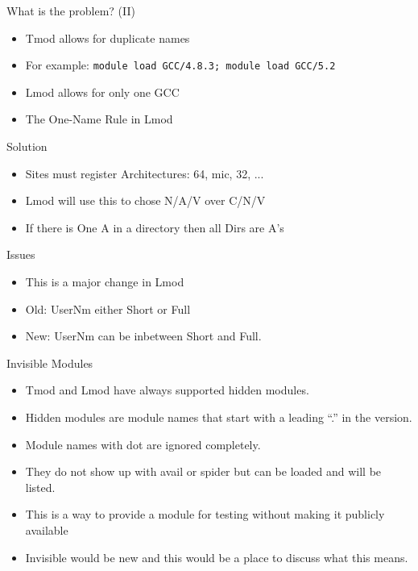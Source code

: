 \documentclass{beamer}
\begin{document}
\begin{frame}{What is the problem? (II)}
  \begin{itemize}
    \item Tmod allows for duplicate names
    \item For example: \texttt{module load GCC/4.8.3; module load GCC/5.2 }
    \item Lmod allows for only one GCC
    \item The One-Name Rule in Lmod
  \end{itemize}
\end{frame}

\begin{frame}{Solution}
  \begin{itemize}
    \item Sites must register Architectures:  64, mic, 32, ...
    \item Lmod will use this to chose N/A/V over C/N/V
    \item If there is One A in a directory then all Dirs are A's
  \end{itemize}
\end{frame}

\begin{frame}{Issues}
  \begin{itemize}
    \item This is a major change in Lmod
    \item Old: UserNm either Short or Full
    \item New: UserNm can be inbetween Short and Full.
  \end{itemize}
\end{frame}


\begin{frame}{Invisible Modules}
  \begin{itemize}
    \item Tmod and Lmod have always supported hidden modules.
    \item Hidden modules are module names that start with a leading
      ``.'' in the version.
    \item Module names with dot are ignored completely.
    \item They do not show up with avail or spider but can be loaded
      and will be listed.  
    \item This is a way to provide a module for testing without making
      it publicly available
    \item Invisible would be new and this would be a place
      to discuss what this means.
  \end{itemize}
\end{frame}
\end{document}
